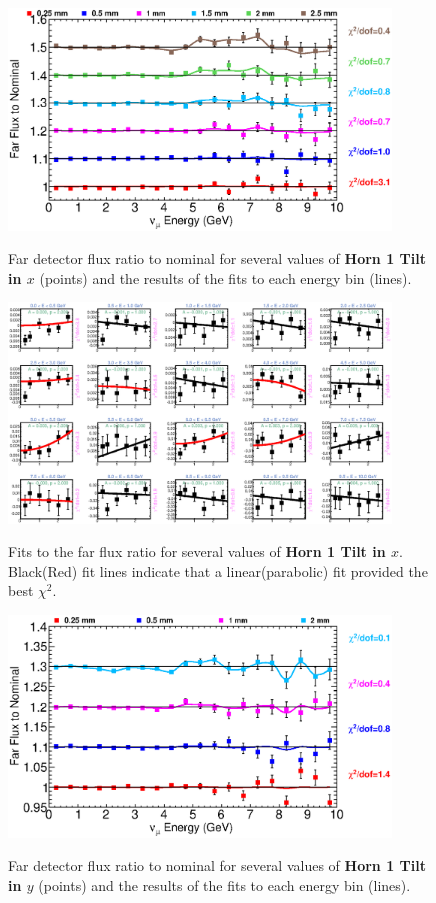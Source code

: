 \begin{figure}[ht]
  \begin{center}
    {\includegraphics[width=4.0in]{figures/Horn1XTilt_far_summary.eps}}
  \end{center}
\caption{ Far detector flux ratio to nominal for several values of {\bf Horn 1 Tilt in $x$} (points) and the results of the fits to each energy bin (lines).}
\end{figure}

\begin{figure}[hb]
  \begin{center}
    {\includegraphics[width=4.0in]{figures/Horn1XTilt_far_fits.eps}}
  \end{center}
\caption{ Fits to the far flux ratio for several values of {\bf Horn 1 Tilt in $x$}. Black(Red) fit lines indicate that a linear(parabolic) fit provided the best $\chi^2$. }
\end{figure}

\begin{figure}[ht]
  \begin{center}
    {\includegraphics[width=4.0in]{figures/Horn1YTilt_far_summary.eps}}
  \end{center}
\caption{ Far detector flux ratio to nominal for several values of {\bf Horn 1 Tilt in $y$} (points) and the results of the fits to each energy bin (lines).}
\end{figure}


